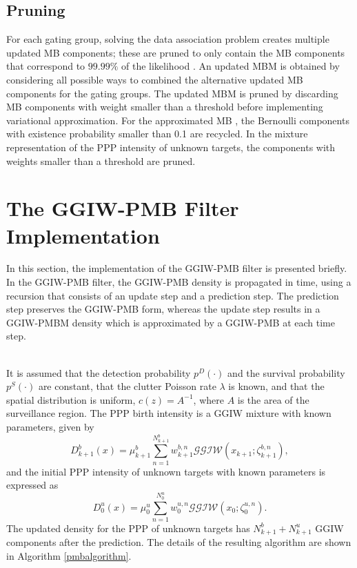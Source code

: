 \subsection{Pruning}
For each gating group, solving the data association problem creates multiple updated MB components; these are pruned to only contain the MB components that correspond to $99.99\%$ of the likelihood \cite{pmbmextended2}. An updated MBM is obtained by considering all possible ways to combined the alternative updated MB components for the gating groups. The updated MBM is pruned by discarding MB components with weight smaller than a threshold before implementing variational approximation. For the approximated MB , the Bernoulli components with existence probability smaller than 0.1 are recycled. In the mixture representation of the PPP intensity of unknown targets, the components with weights smaller than a threshold are pruned.  



\section{The GGIW-PMB Filter Implementation}
In this section, the implementation of the GGIW-PMB filter is presented briefly. In the GGIW-PMB filter, the GGIW-PMB density is propagated in time, using a recursion that consists of an update step and a prediction step. The prediction step preserves the GGIW-PMB form, whereas the update step results in a GGIW-PMBM density which is approximated by a GGIW-PMB at each time step. 

~\\
It is assumed that the detection probability $p^D(\cdot)$ and the survival probability $p^S(\cdot)$ are constant, that the clutter Poisson rate $\lambda$ is known, and that the spatial distribution is uniform, $c(z) = A^{-1}$, where $A$ is the area of the surveillance region. The PPP birth intensity is a GGIW mixture with known parameters, given by
\begin{equation}
    D^b_{k+1}(x) = \mu^b_{k+1}\sum^{N^b_{k+1}}_{n=1}w^{b,n}_{k+1}\mathcal{GGIW}(x_{k+1};\zeta^{b,n}_{k+1}),
\end{equation}
and the initial PPP intensity of unknown targets with known parameters is expressed as
\begin{equation}
    D^u_{0}(x) = \mu^u_{0}\sum^{N^u_{0}}_{n=1}w^{u,n}_{0}\mathcal{GGIW}(x_{0};\zeta^{u,n}_{0}).
\end{equation}
The updated density for the PPP of unknown targets has $N^b_{k+1}+N^u_{k+1}$ GGIW components after the prediction. The details of the resulting algorithm are shown in Algorithm \ref{pmbalgorithm}.


